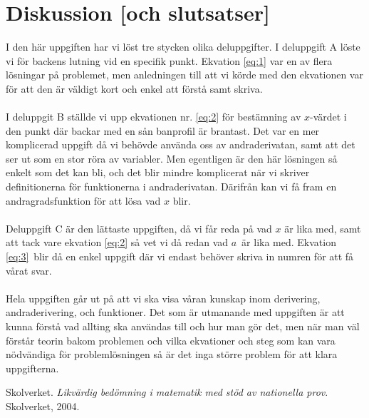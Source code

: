 \documentclass[a4paper,12pt]{article}
\begin{document}
\section{Diskussion [och slutsatser]}
  \label{sec:disk}
    I den här uppgiften har vi löst tre stycken olika deluppgifter. 
    I deluppgift A \cite{Skolverk} löste vi för backens lutning vid en 
    specifik punkt. Ekvation \ref{eq:1} var en av flera lösningar på 
    problemet, men anledningen till att vi körde med den ekvationen var 
    för att den är väldigt kort och enkel att förstå samt skriva. 
    \\
    \\
    I deluppgit B \cite{Skolverk} ställde vi upp ekvationen nr. \ref{eq:2} för 
    bestämning av $x$-värdet i den punkt där backar med en sån banprofil är 
    brantast. Det var en mer komplicerad uppgift då vi behövde använda oss av 
    andraderivatan, samt att det ser ut som en stor röra av variabler. Men 
    egentligen är den här lösningen så enkelt som det kan bli, och det blir 
    mindre komplicerat när vi skriver definitionerna för funktionerna i 
    andraderivatan. Därifrån kan vi få fram en andragradsfunktion för att lösa 
    vad $x$ blir.
    \\
    \\
    Deluppgift C \cite{Skolverk} är den lättaste uppgiften, då vi får reda på 
    vad $x$ är lika med, samt att tack vare ekvation \ref{eq:2} så vet vi då 
    redan vad $a$ är lika med. Ekvation \ref{eq:3} blir då en enkel uppgift 
    där vi endast behöver skriva in numren för att få vårat svar. 
    \\
    \\
    Hela uppgiften går ut på att vi ska visa våran kunskap inom derivering,
    andraderivering, och funktioner. Det som är utmanande med uppgiften är att
    kunna förstå vad allting ska användas till och hur man gör det, men när 
    man väl förstår teorin bakom problemen och vilka ekvationer och steg som
    kan vara nödvändiga för problemlösningen så är det inga större problem 
    för att klara uppgifterna. 
\begin{thebibliography}{99}
%
Skolverket.
\textit{Likvärdig bedömning i matematik med stöd av nationella prov}. 
Skolverket, 2004.

\end{thebibliography}
%
\end{document}

